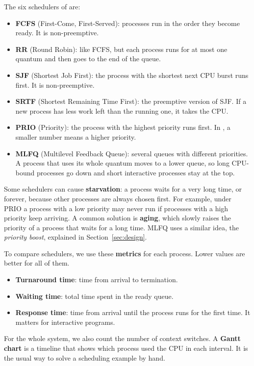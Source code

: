 The six schedulers of \ossim{} are:
\begin{itemize}
    \item \textbf{FCFS} (First-Come, First-Served): processes run in the order they become ready. It is non-preemptive.
    \item \textbf{RR} (Round Robin): like FCFS, but each process runs for at most one quantum and then goes to the end of the queue.
    \item \textbf{SJF} (Shortest Job First): the process with the shortest next CPU burst runs first. It is non-preemptive.
    \item \textbf{SRTF} (Shortest Remaining Time First): the preemptive version of SJF. If a new process has less work left than the running one, it takes the CPU.
    \item \textbf{PRIO} (Priority): the process with the highest priority runs first. In \ossim, a smaller number means a higher priority.
    \item \textbf{MLFQ} (Multilevel Feedback Queue): several queues with different priorities. A process that uses its whole quantum moves to a lower queue, so long CPU-bound processes go down and short interactive processes stay at the top.
\end{itemize}

Some schedulers can cause \textbf{starvation}: a process waits for a very long time, or forever, because other processes are always chosen first. For example, under PRIO a process with a low priority may never run if processes with a high priority keep arriving. A common solution is \textbf{aging}, which slowly raises the priority of a process that waits for a long time. MLFQ uses a similar idea, the \emph{priority boost}, explained in Section~\ref{sec:design}.

To compare schedulers, we use these \textbf{metrics} for each process. Lower values are better for all of them.
\begin{itemize}
    \item \textbf{Turnaround time}: time from arrival to termination.
    \item \textbf{Waiting time}: total time spent in the ready queue.
    \item \textbf{Response time}: time from arrival until the process runs for the first time. It matters for interactive programs.
\end{itemize}
For the whole system, we also count the number of context switches. A \textbf{Gantt chart} is a timeline that shows which process used the CPU in each interval. It is the usual way to solve a scheduling example by hand.

